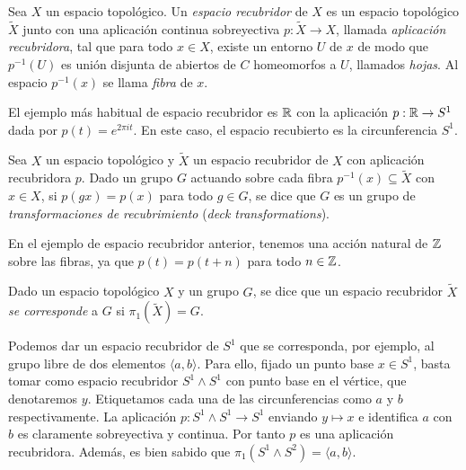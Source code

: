 \documentclass[TFG.tex]{subfiles}
\begin{document}
\begin{defi}
Sea $X$ un espacio topológico. Un \emph{espacio recubridor} de $X$ es un espacio topológico $\tilde{X}$ junto con una aplicación continua sobreyectiva $p:\tilde{X}\to X$, llamada \emph{aplicación recubridora}, tal que para todo $x\in X$, existe un entorno $U$ de $x$ de modo que $p^{-1}(U)$ es unión disjunta de abiertos de $C$ homeomorfos a $U$, llamados \emph{hojas}. Al espacio $p^{-1}(x)$ se llama \emph{fibra} de $x$.
\end{defi}

\begin{ej}
El ejemplo más habitual de espacio recubridor es $\mathbb{R}$ con la aplicación $p:\mathbb{R}\to S^1$ dada por $p(t)=e^{2\pi i t}$. En este caso, el espacio recubierto es la circunferencia $S^1$. 
\end{ej}

\begin{defi}
Sea $X$ un espacio topológico y $\tilde{X}$ un espacio recubridor de $X$ con aplicación recubridora $p$. Dado un grupo $G$ actuando sobre cada fibra $p^{-1}(x)\subseteq\tilde{X}$ con $x\in X$, si $p(gx)=p(x)$ para todo $g\in G$, se dice que $G$ es un grupo de \emph{transformaciones de recubrimiento} (\emph{deck transformations}).
\end{defi}

\begin{ej}
En el ejemplo de espacio recubridor anterior, tenemos una acción natural de $\mathbb{Z}$ sobre las fibras, ya que $p(t)=p(t+ n)$ para todo $n\in\mathbb{Z}$. 
\end{ej}

\begin{defi}
Dado un espacio topológico $X$ y un grupo $G$, se dice que un espacio recubridor $\tilde{X}$ \emph{se corresponde} a $G$ si $\pi_1(\tilde{X})=G$. 
\end{defi}

\begin{ej}
Podemos dar un espacio recubridor de $S^1$ que se corresponda, por ejemplo, al grupo libre de dos elementos $\langle a, b\rangle$. Para ello, fijado un punto base $x\in S^1$, basta tomar como espacio recubridor $S^1\land S^1$ con punto base en el vértice, que denotaremos $y$. Etiquetamos cada una de las circunferencias como $a$ y $b$ respectivamente. La aplicación $p:S^1\land S^1\to S^1$ enviando $y\mapsto x$ e identifica $a$ con $b$ es claramente sobreyectiva y continua. Por tanto $p$ es una aplicación recubridora. Además, es bien sabido que $\pi_1(S^1\land S^2)=\langle a, b\rangle$. 
\end{ej}
\end{document}
